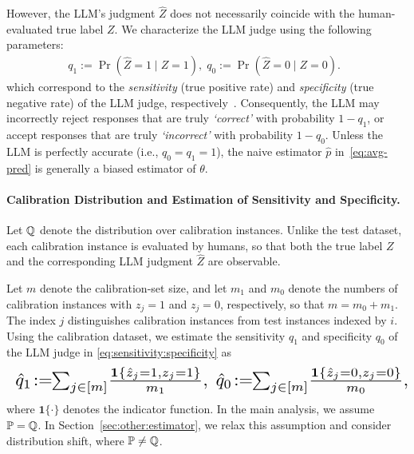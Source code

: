However, the LLM’s judgment $\hat{Z}$ does not necessarily coincide with the human-evaluated true label $Z$. We characterize the LLM judge using the following parameters:
\begin{align}
    \label{eq:sensitivity:specificity}
    q_1 := \Pr(\hat{Z} = 1 \!\mid\! Z = 1),
    \;
    q_0 := \Pr(\hat{Z} = 0 \!\mid\! Z = 0).
    \;\;
\end{align}
which correspond to the \emph{sensitivity} (true positive rate) and \emph{specificity} (true negative rate) of the LLM judge, respectively~\citep{forman2008quantifying, lang2014confidence}.
Consequently, the LLM may incorrectly reject responses that are truly \emph{`correct'} with probability $1-q_1$, or accept responses that are truly \emph{`incorrect'} with probability $1-q_0$.
Unless the LLM is perfectly accurate (i.e., $q_0 = q_1 = 1$), the naive estimator $\hat{p}$ in~\eqref{eq:avg-pred} is generally a biased estimator of $\theta$.

\paragraph{Calibration Distribution and Estimation of Sensitivity and Specificity.}
Let ${\mathbb{Q}}$ denote the distribution over calibration instances.
Unlike the test dataset, each calibration instance is evaluated by humans, so that both the true label $Z$ and the corresponding LLM judgment $\hat{Z}$ are observable.

Let $m$ denote the calibration-set size, and let $m_1$ and $m_0$ denote the numbers of calibration instances with $z_j=1$ and $z_j=0$, respectively, so that $m = m_0 + m_1$. The index $j$ distinguishes calibration instances from test instances indexed by $i$.
Using the calibration dataset, we estimate the sensitivity $q_1$ and specificity $q_0$ of the LLM judge in \eqref{eq:sensitivity:specificity} as
\begin{equation}
    \resizebox{\linewidth}{!}{$
    \hat{q}_1 \!:= \!\!\sum_{j \in [m]}\! \frac{\mathbf{1}\{\hat{z}_j = 1, z_j = 1\}}{m_1},
    \;
    \hat{q}_0 \!:= \!\!\sum_{j \in [m]}\! \frac{\mathbf{1}\{\hat{z}_j = 0, z_j = 0\}}{m_0},
    \!\!\!
    $}
\end{equation}
where $\mathbf{1}\{\cdot\}$ denotes the indicator function. 
In the main analysis, we assume ${\mathbb{P}}={\mathbb{Q}}$. In Section~\ref{sec:other:estimator}, we relax this assumption and consider distribution shift, where ${\mathbb{P}}\neq{\mathbb{Q}}$.





